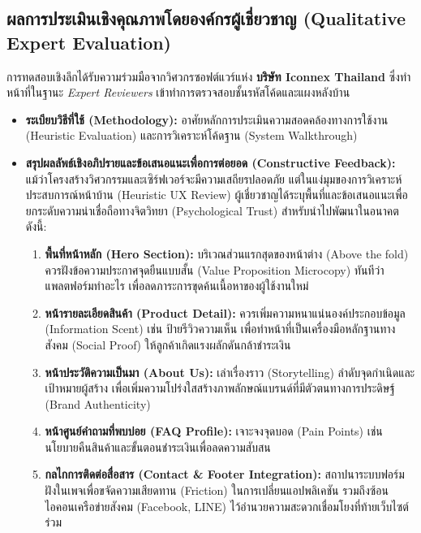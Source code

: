 \subsection{ผลการประเมินเชิงคุณภาพโดยองค์กรผู้เชี่ยวชาญ (Qualitative Expert Evaluation)}
การทดสอบเชิงลึกได้รับความร่วมมือจากวิศวกรซอฟต์แวร์แห่ง \textbf{บริษัท Iconnex Thailand} ซึ่งทำหน้าที่ในฐานะ \textit{Expert Reviewers} เข้าทำการตรวจสอบชั้นรหัสโค้ดและแผงหลังบ้าน
\begin{itemize}
    \item \textbf{ระเบียบวิธีที่ใช้ (Methodology):} อาศัยหลักการประเมินความสอดคล้องทางการใช้งาน (Heuristic Evaluation) และการวิเคราะห์โค้ดฐาน (System Walkthrough)
    \item \textbf{สรุปผลลัพธ์เชิงอภิปรายและข้อเสนอแนะเพื่อการต่อยอด (Constructive Feedback):} 
    แม้ว่าโครงสร้างวิศวกรรมและเซิร์ฟเวอร์จะมีความเสถียรปลอดภัย แต่ในแง่มุมของการวิเคราะห์ประสบการณ์หน้าบ้าน (Heuristic UX Review) ผู้เชี่ยวชาญได้ระบุพื้นที่และข้อเสนอแนะเพื่อยกระดับความน่าเชื่อถือทางจิตวิทยา (Psychological Trust) สำหรับนำไปพัฒนาในอนาคต ดังนี้:
    \begin{enumerate}
        \item \textbf{พื้นที่หน้าหลัก (Hero Section):} บริเวณส่วนแรกสุดของหน้าต่าง (Above the fold) ควรฝังข้อความประกาศจุดยืนแบบสั้น (Value Proposition Microcopy) ทันทีว่าแพลตฟอร์มทำอะไร เพื่อลดภาระการขุดค้นเนื้อหาของผู้ใช้งานใหม่
        \item \textbf{หน้ารายละเอียดสินค้า (Product Detail):} ควรเพิ่มความหนาแน่นองค์ประกอบข้อมูล (Information Scent) เช่น ป้ายรีวิวความเห็น เพื่อทำหน้าที่เป็นเครื่องมือหลักฐานทางสังคม (Social Proof) ให้ลูกค้าเกิดแรงผลักดันกล้าชำระเงิน
        \item \textbf{หน้าประวัติความเป็นมา (About Us):} เล่าเรื่องราว (Storytelling) ลำดับจุดกำเนิดและเป้าหมายผู้สร้าง เพื่อเพิ่มความโปร่งใสสร้างภาพลักษณ์แบรนด์ที่มีตัวตนทางการประดิษฐ์ (Brand Authenticity)
        \item \textbf{หน้าศูนย์คำถามที่พบบ่อย (FAQ Profile):} เจาะจงจุดบอด (Pain Points) เช่น นโยบายคืนสินค้าและขั้นตอนชำระเงินเพื่อลดความสับสน
        \item \textbf{กลไกการติดต่อสื่อสาร (Contact \& Footer Integration):} สถาปนาระบบฟอร์มฝังในเพจเพื่อขจัดความเสียดทาน (Friction) ในการเปลี่ยนแอปพลิเคชัน รวมถึงซ้อนไอคอนเครือข่ายสังคม (Facebook, LINE) ไว้อำนวยความสะดวกเชื่อมโยงที่ท้ายเว็บไซต์ร่วม
    \end{enumerate}
\end{itemize}

